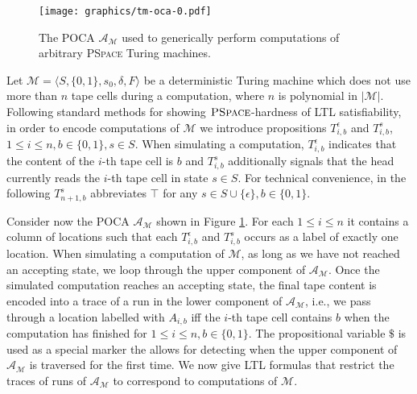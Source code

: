 \documentclass{llncs}
\newcommand{\automaton}{\ensuremath{\mathcal{A}}}
\newcommand{\tm}{\ensuremath{\mathcal{M}}}
\newcommand{\poca}{\textsc{POCA} }
\newcommand{\pspace}{\textsc{PSpace} }
\begin{document}
\begin{figure}
\begin{center}
\texttt{[image: graphics/tm-oca-0.pdf]}
\end{center}
\caption{The \poca $\automaton_\tm$ used to generically perform
  computations of arbitrary \pspace Turing machines.}
\label{fig:tm}
\end{figure}
Let $\tm=\langle S, \{0, 1\}, s_0, \delta, F \rangle$ be a
deterministic Turing machine which does not use more than $n$ tape
cells during a computation, where $n$ is polynomial in
$|\tm|$. Following standard methods for showing $\pspace$-hardness of
LTL satisfiability, in order to encode computations of $\tm$ we
introduce propositions $T_{i,b}^\epsilon$ and $T^s_{i,b}$, $1\le i\le
n, b\in\{0,1\}, s\in S$. When simulating a computation,
$T_{i,b}^\epsilon$ indicates that the content of the $i$-th tape cell
is $b$ and $T_{i,b}^s$ additionally signals that the head currently
reads the $i$-th tape cell in state $s\in S$.  For technical
convenience, in the following $T_{n+1,b}^s$ abbreviates $\top$ for any
$s\in S\cup \{\epsilon\}, b\in\{0,1\}$.

Consider now the \poca $\automaton_\tm$ shown in Figure
\ref{fig:tm}. For each $1\le i\le n$ it contains a column of locations
such that each $T_{i,b}^\epsilon$ and $T_{i,b}^s$ occurs as a label of
exactly one location.  When simulating a computation of $\tm$, as long
as we have not reached an accepting state, we loop through the upper
component of $\automaton_\tm$. Once the simulated computation reaches
an accepting state, the final tape content is encoded into a trace of
a run in the lower component of $\automaton_\tm$, i.e., we pass
through a location labelled with $A_{i,b}$ iff the $i$-th tape cell
contains $b$ when the computation has finished for $1\le i\le n, b\in
\{0,1\}$.  The propositional variable $\$$ is used as a special marker
the allows for detecting when the upper component of $\automaton_\tm$
is traversed for the first time. We now give LTL formulas that
restrict the traces of runs of $\automaton_\tm$ to correspond to
computations of $\tm$.
\end{document}
